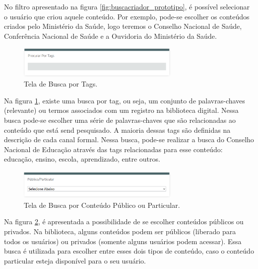 No filtro apresentado na figura \ref{fig:buscacriador_prototipo}, é possível selecionar o usuário que criou aquele conteúdo. Por exemplo, pode-se escolher os conteúdos criados pelo Ministério da Saúde, logo teremos o Conselho Nacional de Saúde, Conferência Nacional de Saúde e a Ouvidoria do Ministério da Saúde.

\graphicspath{{figuras/prototipo/}}
\begin{figure}[H]
\centering
\includegraphics[width=0.7\textwidth]{busca-tags}
\caption{Tela de Busca por Tags.}
\label{fig:buscatags_prototipo}
\end{figure}

Na figura \ref{fig:buscatags_prototipo}, existe uma busca por tag, ou seja, um conjunto de palavras-chaves (relevante) ou termos associados com um registro na biblioteca digital. Nessa busca pode-se escolher uma série de palavras-chaves que são relacionadas ao conteúdo que está send pesquisado. A maioria dessas tags são definidas na descrição de cada canal formal. Nessa busca, pode-se realizar a busca do Conselho Nacional de Educação através das tags relacionadas para esse conteúdo: educação, ensino, escola, aprendizado, entre outros.

\graphicspath{{figuras/prototipo/}}
\begin{figure}[H]
\centering
\includegraphics[width=0.7\textwidth]{busca-pub-particular}
\caption{Tela de Busca por Conteúdo Público ou Particular.}
\label{fig:buscaconteudo_prototipo}
\end{figure}

Na figura \ref{fig:buscaconteudo_prototipo}, é apresentada a possibilidade de se escolher conteúdos públicos ou privados. Na biblioteca, alguns conteúdos podem ser públicos (liberado para todos os usuários) ou privados (somente alguns usuários podem acessar). Essa busca é utilizada para escolher entre esses dois tipos de conteúdo, caso o conteúdo particular esteja disponível para o seu usuário.

